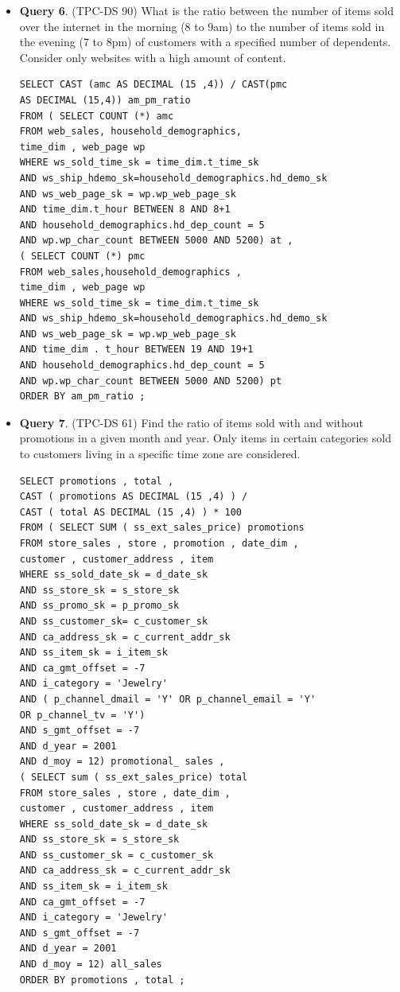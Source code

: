 \documentclass[12pt]{book}
\begin{document}
\begin{appendices}
\begin{itemize}
\item \textbf{Query 6}. (TPC-DS 90) What is the ratio between the number of items sold over the internet in the morning (8 to 9am) to the 
number of items sold in the evening (7 to 8pm) of customers with a specified number of dependents. Consider only websites with a high amount 
of content.
\begin{lstlisting}[frame=single]
SELECT CAST (amc AS DECIMAL (15 ,4)) / CAST(pmc 
AS DECIMAL (15,4)) am_pm_ratio
FROM ( SELECT COUNT (*) amc
FROM web_sales, household_demographics, 
time_dim , web_page wp
WHERE ws_sold_time_sk = time_dim.t_time_sk
AND ws_ship_hdemo_sk=household_demographics.hd_demo_sk
AND ws_web_page_sk = wp.wp_web_page_sk
AND time_dim.t_hour BETWEEN 8 AND 8+1
AND household_demographics.hd_dep_count = 5
AND wp.wp_char_count BETWEEN 5000 AND 5200) at ,
( SELECT COUNT (*) pmc
FROM web_sales,household_demographics , 
time_dim , web_page wp
WHERE ws_sold_time_sk = time_dim.t_time_sk
AND ws_ship_hdemo_sk=household_demographics.hd_demo_sk
AND ws_web_page_sk = wp.wp_web_page_sk
AND time_dim . t_hour BETWEEN 19 AND 19+1
AND household_demographics.hd_dep_count = 5
AND wp.wp_char_count BETWEEN 5000 AND 5200) pt
ORDER BY am_pm_ratio ;
\end{lstlisting}

\item \textbf{Query 7}. (TPC-DS 61) Find the ratio of items sold with and without promotions in a given month and year. Only items in certain 
categories sold to customers living in a specific time zone are considered.
\begin{lstlisting}[frame=single]
SELECT promotions , total ,
CAST ( promotions AS DECIMAL (15 ,4) ) /
CAST ( total AS DECIMAL (15 ,4) ) * 100
FROM ( SELECT SUM ( ss_ext_sales_price) promotions
FROM store_sales , store , promotion , date_dim ,
customer , customer_address , item
WHERE ss_sold_date_sk = d_date_sk
AND ss_store_sk = s_store_sk
AND ss_promo_sk = p_promo_sk
AND ss_customer_sk= c_customer_sk
AND ca_address_sk = c_current_addr_sk
AND ss_item_sk = i_item_sk
AND ca_gmt_offset = -7
AND i_category = 'Jewelry'
AND ( p_channel_dmail = 'Y' OR p_channel_email = 'Y'
OR p_channel_tv = 'Y')
AND s_gmt_offset = -7
AND d_year = 2001
AND d_moy = 12) promotional_ sales ,
( SELECT sum ( ss_ext_sales_price) total
FROM store_sales , store , date_dim ,
customer , customer_address , item
WHERE ss_sold_date_sk = d_date_sk
AND ss_store_sk = s_store_sk
AND ss_customer_sk = c_customer_sk
AND ca_address_sk = c_current_addr_sk
AND ss_item_sk = i_item_sk
AND ca_gmt_offset = -7
AND i_category = 'Jewelry'
AND s_gmt_offset = -7
AND d_year = 2001
AND d_moy = 12) all_sales
ORDER BY promotions , total ;
\end{lstlisting}


\end{itemize}
\end{appendices}
\end{document}
